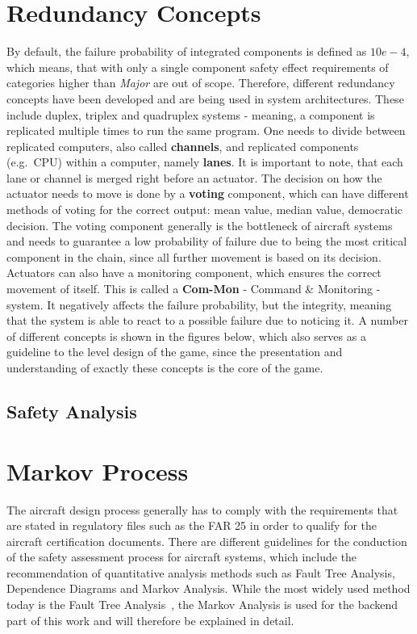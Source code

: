 \section{Redundancy Concepts}\label{sec:redundancy-concepts}
By default, the failure probability of integrated components is defined as $10e-4$, which means, that with only a single component
safety effect requirements of categories higher than \textit{Major} are out of scope.
Therefore, different redundancy concepts have been developed and are being used in system architectures.
These include duplex, triplex and quadruplex systems - meaning, a component is replicated multiple times to run the same program.
One needs to divide between replicated computers, also called \textbf{channels}, and replicated components (e.g.\ CPU) within a computer,
namely \textbf{lanes}.
It is important to note, that each lane or channel is merged right before an actuator.
The decision on how the actuator needs to move is done by a \textbf{voting} component, which can have different methods of voting
for the correct output: mean value, median value, democratic decision.
The voting component generally is the bottleneck of aircraft systems and needs to guarantee a low probability of failure
due to being the most critical component in the chain, since all further movement is based on its decision.
Actuators can also have a monitoring component, which ensures the correct movement of itself.
This is called a \textbf{Com-Mon} - Command \& Monitoring - system.
It negatively affects the failure probability, but the integrity, meaning that the system is able to react to a possible failure due
to noticing it.
A number of different concepts is shown in the figures below, which also serves as a guideline to the level design of the game,
since the presentation and understanding of exactly these concepts is the core of the game.
\subsection{Safety Analysis}\label{subsec:safety-analysis}

\section{Markov Process}\label{sec:markov-process}
The aircraft design process generally has to comply with the requirements that are stated in regulatory files such as the FAR 25
in order to qualify for the aircraft certification documents.
There are different guidelines for the conduction of the safety assessment process for aircraft systems, which include the
recommendation of quantitative analysis methods such as Fault Tree Analysis, Dependence Diagrams and Markov Analysis.
While the most widely used method today is the Fault Tree Analysis~\cite{7447967}, the Markov Analysis is used for the backend
part of this work and will therefore be explained in detail.


